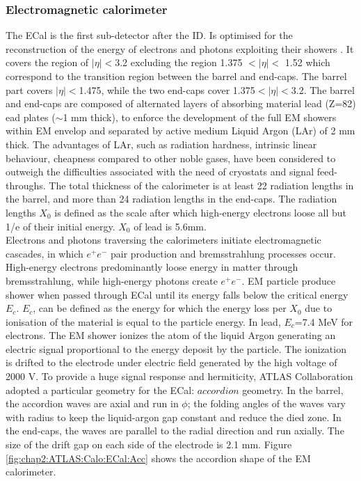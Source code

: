 \subsubsection{Electromagnetic calorimeter}
\label{chap2:ATLAS:Calo:ECAL}
The ECal is the first sub-detector after the ID. Is optimised for the reconstruction of the energy of electrons and photons exploiting their showers \cite{LAr_TRD}. It covers the region of $|\eta|<$3.2 excluding the region 1.375 $<|\eta|<$ 1.52 which correspond to the transition region between the barrel and end-caps. The barrel part covers $|\eta|<$1.475, while the two end-caps cover 1.375$<|\eta|<$3.2. The barrel and end-caps are composed of alternated layers of absorbing material lead (Z=82) ead plates ($\sim$1 mm thick), to enforce the development of the full EM showers within EM envelop and separated by active medium Liquid Argon (LAr) of 2 mm thick. The advantages of LAr, such as radiation hardness, intrinsic linear behaviour, cheapness compared to other noble gases, have been considered to outweigh the difficulties associated with the need of cryostats and signal feed-throughs. The total thickness of the calorimeter is at least 22 radiation lengths in the barrel, and more than 24 radiation lengths in the end-caps. The radiation lengths $X_0$ is defined as the scale after which high-energy electrons loose all but 1/e of their initial energy. $X_0$ of lead is 5.6mm. \\
Electrons and photons traversing the calorimeters initiate electromagnetic cascades, in which $e^+e^-$ pair production and bremsstrahlung processes occur. High-energy electrons predominantly loose energy in matter through bremsstrahlung, while high-energy photons create $e^+e^-$. EM particle produce shower when passed through ECal until its energy falls below the critical energy $E_c$. $E_c$, can be defined as the energy for which the energy loss per $X_0$ due to ionisation of the material is equal to the particle energy. In lead, $E_c$=7.4 MeV for electrons. The EM shower ionizes the atom of the liquid Argon generating an electric signal proportional to the energy deposit by the particle. The ionization is drifted to the electrode under electric field generated by the high voltage of 2000 V. To provide a huge signal response and hermiticity, ATLAS Collaboration adopted a particular geometry for the ECal: $accordion$ geometry. In the barrel, the accordion waves are axial and run in $\phi$; the folding angles of the waves vary with radius to keep the liquid-argon gap constant and reduce the died zone. In the end-caps, the waves are parallel to the radial direction and run axially. The size of the drift gap on each side of the electrode is 2.1 mm. Figure \ref{fig:chap2:ATLAS:Calo:ECal:Acc} shows the accordion shape of the EM calorimeter.
